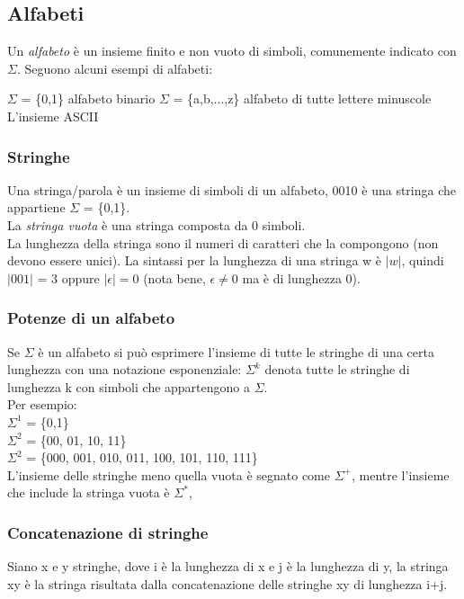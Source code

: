 \documentclass[12pt]{article}
\begin{document}
\subsection{Alfabeti}
Un \emph{alfabeto} è un insieme finito e non vuoto di simboli, comunemente indicato con $\Sigma$. Seguono alcuni esempi di alfabeti: 
\begin{outline}
  \1 $\Sigma$ = \{0,1\} alfabeto binario
  \1 $\Sigma$ = \{a,b,...,z\} alfabeto di tutte lettere minuscole
  \1 L'insieme ASCII
\end{outline}

\subsubsection{Stringhe}
Una stringa/parola è un insieme di simboli di un alfabeto, 0010 è una stringa che appartiene $\Sigma$ = \{0,1\}.
\\ La \emph{stringa vuota} è una stringa composta da 0 simboli.
\\ La lunghezza della stringa sono il numeri di caratteri che la compongono (non devono essere unici). La sintassi per la lunghezza di una stringa w è $|w|$, quindi $|001|$ = 3 oppure $|\epsilon| = 0$ (nota bene, $\epsilon \ne 0$ ma è di lunghezza 0).

\subsubsection*{Potenze di un alfabeto}
Se $\Sigma$ è un alfabeto si può esprimere l'insieme di tutte le stringhe di una certa lunghezza con una notazione esponenziale: $\Sigma^k$ denota tutte le stringhe di lunghezza k con simboli che appartengono a $\Sigma$. \\
Per esempio: 
\\ $\Sigma^1$ = \{0,1\} 
\\ $\Sigma^2$ = \{00, 01, 10, 11\}
\\ $\Sigma^2$ = \{000, 001, 010, 011, 100, 101, 110, 111\}
\\ L'insieme delle stringhe meno quella vuota è segnato come $\Sigma^+$, mentre l'insieme che include la stringa vuota è $\Sigma^*$,

\subsubsection{Concatenazione di stringhe}
Siano x e y stringhe, dove i è la lunghezza di x e j è la lunghezza di y, la stringa xy è la stringa risultata dalla concatenazione delle stringhe xy di lunghezza i+j.
\end{document}

